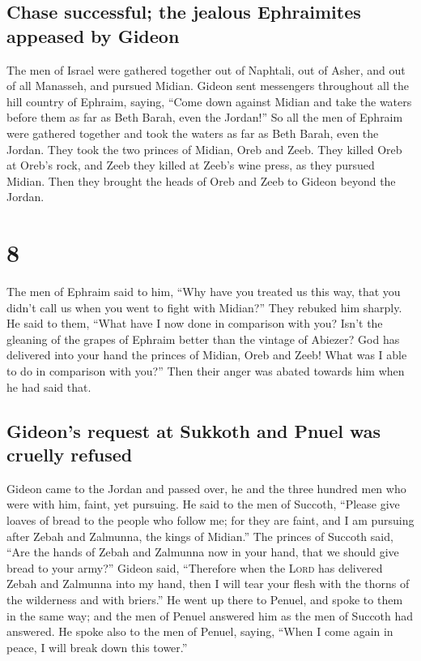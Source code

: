 \hypertarget{chase-successful-the-jealous-ephraimites-appeased-by-gideon}{%
\subsection{Chase successful; the jealous Ephraimites appeased by
Gideon}\label{chase-successful-the-jealous-ephraimites-appeased-by-gideon}}

 The men of Israel were gathered together out of
Naphtali, out of Asher, and out of all Manasseh, and pursued Midian.
 Gideon sent messengers throughout all the hill country
of Ephraim, saying, ``Come down against Midian and take the waters
before them as far as Beth Barah, even the Jordan!'' So all the men of
Ephraim were gathered together and took the waters as far as Beth Barah,
even the Jordan.  They took the two princes of Midian,
Oreb and Zeeb. They killed Oreb at Oreb's rock, and Zeeb they killed at
Zeeb's wine press, as they pursued Midian. Then they brought the heads
of Oreb and Zeeb to Gideon beyond the Jordan.

\hypertarget{section-7}{%
\section{8}\label{section-7}}

 The men of Ephraim said to him, ``Why have you treated us
this way, that you didn't call us when you went to fight with Midian?''
They rebuked him sharply.  He said to them, ``What have I
now done in comparison with you? Isn't the gleaning of the grapes of
Ephraim better than the vintage of Abiezer?  God has
delivered into your hand the princes of Midian, Oreb and Zeeb! What was
I able to do in comparison with you?'' Then their anger was abated
towards him when he had said that.

\hypertarget{gideons-request-at-sukkoth-and-pnuel-was-cruelly-refused}{%
\subsection{Gideon's request at Sukkoth and Pnuel was cruelly
refused}\label{gideons-request-at-sukkoth-and-pnuel-was-cruelly-refused}}

 Gideon came to the Jordan and passed over, he and the
three hundred men who were with him, faint, yet pursuing. 
He said to the men of Succoth, ``Please give loaves of bread to the
people who follow me; for they are faint, and I am pursuing after Zebah
and Zalmunna, the kings of Midian.''  The princes of
Succoth said, ``Are the hands of Zebah and Zalmunna now in your hand,
that we should give bread to your army?''  Gideon said,
``Therefore when the \textsc{Lord} has delivered Zebah and Zalmunna into
my hand, then I will tear your flesh with the thorns of the wilderness
and with briers.''  He went up there to Penuel, and spoke
to them in the same way; and the men of Penuel answered him as the men
of Succoth had answered.  He spoke also to the men of
Penuel, saying, ``When I come again in peace, I will break down this
tower.''

